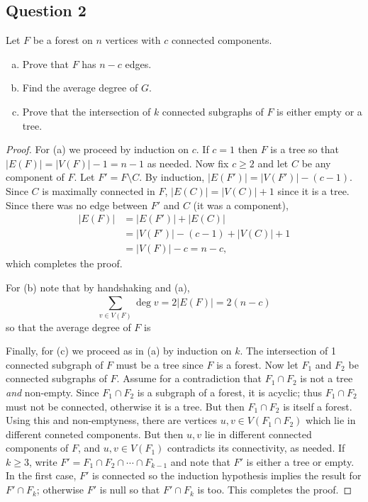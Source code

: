 \subsection{Question 2}

Let \( F \) be a forest on \( n \) vertices with \( c \) connected components. 
\begin{enumerate}[(a), leftmargin=1cm]
	\item Prove that \( F \) has \( n - c \) edges.
	\item Find the average degree of \( G \).
	\item Prove that the intersection of \( k \) connected subgraphs of \( F \) is either empty or a tree.
\end{enumerate}
\begin{proof} For (a) we proceed by induction on \( c \). If \( c = 1 \) then \( F \) is a tree so that \( |E(F)| = |V(F)| - 1 = n - 1 \) as needed. Now fix \( c \geq 2 \) and let \( C \) be any component of \( F \). Let \( F' = F \setminus C \). By induction, \( |E(F')| = |V(F')| - (c - 1) \). Since \( C \) is maximally connected in \( F \), \( |E(C)| = |V(C)| + 1 \) since it is a tree. Since there was no edge between \( F' \) and \( C \) (it was a component),
	\begin{align*}
		|E(F)| &= |E(F')| + |E(C)| \\
		       &= |V(F')| - (c - 1) + |V(C)| + 1 \\
		       &= |V(F)| - c = n - c,
	\end{align*}
	which completes the proof.

For (b) note that by handshaking and (a), \[ \sum_{v \in V(F)}^{} \deg v = 2 |E(F)| = 2(n - c)  \] so that the average degree of \( F \) is 

Finally, for (c) we proceed as in (a) by induction on \( k \). The intersection of 1 connected subgraph of \( F \) must be a tree since \( F \) is a forest. Now let \( F_1 \) and \( F_2 \) be connected subgraphs of \( F \). Assume for a contradiction that \( F_1 \cap F_2 \) is not a tree \emph{and} non-empty. Since \( F_1 \cap F_2 \) is a subgraph of a forest, it is acyclic; thus \( F_1 \cap F_2 \) must not be connected, otherwise it is a tree. But then \( F_1 \cap F_2 \) is itself a forest. Using this and non-emptyness, there are vertices \( u,v \in V(F_1 \cap F_2) \) which lie in different conneted components. But then \( u,v \) lie in different connected components of \( F \), and \( u,v \in V(F_1) \) contradicts its connectivity, as needed. If \( k \geq 3 \), write \( F' = F_1 \cap F_2 \cap \cdots \cap F_{k-1}  \) and note that \( F' \) is either a tree or empty. In the first case, \( F' \) is connected so the induction hypothesis implies the result for \( F' \cap F_{k}  \); otherwise \( F' \) is null so that \( F' \cap F_{k}  \) is too. This completes the proof.
\end{proof}
